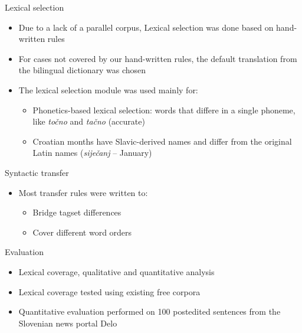 \documentclass{beamer}
\begin{document}
\begin{frame}{Lexical selection}
\begin{itemize}
\item Due to a lack of a parallel corpus, Lexical selection was done based on hand-written rules
\item For cases not covered by our hand-written rules, the default translation from the bilingual dictionary was chosen
\item The lexical selection module was used mainly for:
\begin{itemize}
	\item Phonetics-based lexical selection: words that differe in a single phoneme, like \emph{to\v{c}no} and \emph{ta\v{c}no} (accurate)
	\item Croatian months have Slavic-derived names and differ from the original Latin names (\emph{sije\v{c}anj} -- January)
\end{itemize}
\end{itemize}
\end{frame}


\begin{frame}{Syntactic transfer}
\begin{itemize}
\item Most transfer rules were written to:
\begin{itemize}
\item Bridge tagset differences
\item Cover different word orders
\end{itemize}
\end{itemize}
\end{frame}

\begin{frame}{Evaluation}
\begin{itemize}
\item Lexical coverage, qualitative and quantitative analysis
\item Lexical coverage tested using existing free corpora
\item Quantitative evaluation performed on 100 postedited sentences from the Slovenian news portal Delo

\end{itemize}
\end{frame}
\end{document}
